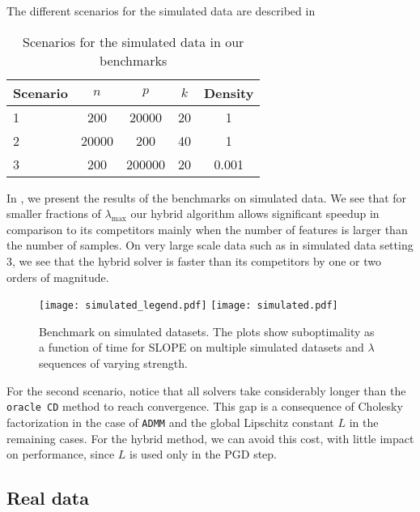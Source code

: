 The different scenarios for the simulated data are described in 

\begin{table}[hbt]
  \centering
  \caption{Scenarios for the simulated data in our benchmarks}
  \label{tab:simulated-data}
  \begin{tabular}{
      l
      S[table-format=5.0,round-mode=off]
      S[table-format=7.0,round-mode=off]
      S[table-format=2.0,round-mode=off]
      S[table-format=1.3,round-mode=off]
    }
    \toprule
    {Scenario} & {\(n\)} & {\(p\)} & {\(k\)} & {Density} \\           & 200     & 20000   & 20      & 1         \\
    2          & 20000   & 200     & 40      & 1         \\
    3          & 200     & 200000 & 20      & 0.001     \\ \bottomrule
  \end{tabular}
\end{table}

In , we present the results of the benchmarks on simulated data.
We see that for smaller fractions of $\lambda_{\text{max}}$ our hybrid algorithm allows significant speedup in comparison to its competitors mainly when the number of features is larger than the number of samples.
On very large scale data such as in simulated data setting $3$, we see that the hybrid solver is faster than its competitors by one or two orders of magnitude.

\begin{figure*}[!t]
  \centering
  \texttt{[image: simulated\_legend.pdf]}
  \texttt{[image: simulated.pdf]}
  \caption{Benchmark on simulated datasets. The plots show suboptimality as a function of time for SLOPE on multiple simulated datasets and $\lambda$ sequences of varying strength.}
  \label{fig:simulated}
\end{figure*}

For the second scenario, notice that all solvers take considerably longer than the \texttt{oracle CD} method to reach convergence.
This gap is a consequence of Cholesky factorization in the case of \texttt{ADMM} and the global Lipschitz constant \(L\) in the remaining cases.
For the hybrid method, we can avoid this cost, with little impact on performance, since \(L\) is used only in the PGD step.

\subsection{Real data}
\label{sec:experiments-real-data}

